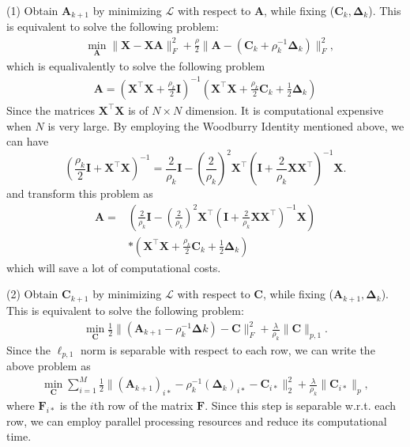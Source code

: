 \documentclass[10pt,twocolumn,letterpaper]{article}
\begin{document}
(1) Obtain $\bm{A}_{k+1}$ by minimizing $\mathcal{L}$ with respect to $\bm{A}$, while fixing ($\bm{C}_{k},\bm{\Delta}_{k}$). This is equivalent to solve the following problem:
\begin{equation}
\begin{split}
\label{e8}
&
\min_{\bm{A}}
\|
\bm{X}
-
\bm{X}\bm{A}
\|_{F}^{2}
+
\frac{\rho}{2}
\|
\bm{A}
-(
\bm{C}_{k}
+
\rho_{k}^{-1}
\bm{\Delta}_{k}
)
\|_{F}^{2},
\end{split}
\end{equation}
which is equalivalently to solve the following problem
\begin{equation}
\begin{split}
\label{e8}
\bm{A}
=
(\bm{X}^{\top}\bm{X}+\frac{\rho_{k}}{2}\bm{I})^{-1}
(\bm{X}^{\top}\bm{X}
+
\frac{\rho_{k}}{2}
\bm{C}_{k}
+
\frac{1}{2}
\bm{\Delta}_{k}
)
\end{split}
\end{equation}
Since the matrices $\bm{X}^{\top}\bm{X}$ is of $N\times N$ dimension. It is computational expensive when $N$ is very large. By employing the Woodburry Identity mentioned above, we can have 
\begin{equation}
(
\frac{\rho_{k}}{2}\bm{I}
+
\bm{X}^{\top}\bm{X}
)^{-1}
=
\frac{2}{\rho_{k}}\bm{I}
-
(\frac{2}{\rho_{k}})^{2}
\bm{X}^{\top}
(
\bm{I}
+
\frac{2}{\rho_{k}}\bm{X}\bm{X}^{\top}
)^{-1}
\bm{X}
.
\end{equation}
and transform this problem as
\begin{equation}
\begin{split}
\label{e8}
\bm{A}
=
&
(
\frac{2}{\rho_{k}}\bm{I}
-
(\frac{2}{\rho_{k}})^{2}
\bm{X}^{\top}
(
\bm{I}
+
\frac{2}{\rho_{k}}\bm{X}\bm{X}^{\top}
)^{-1}
\bm{X}
)
\\
&
*
(\bm{X}^{\top}\bm{X}
+
\frac{\rho_{k}}{2}
\bm{C}_{k}
+
\frac{1}{2}
\bm{\Delta}_{k}
)
\end{split}
\end{equation}
which will save a lot of computational costs.


(2) Obtain $\bm{C}_{k+1}$ by minimizing $\mathcal{L}$ with respect to $\bm{C}$, while fixing ($\bm{A}_{k+1},\bm{\Delta}_{k}$). This is equivalent to solve the following problem:
\begin{equation}
\begin{split}
\label{e6}
\min_{\bm{C}}
\frac{1}{2}
\|
(\bm{A}_{k+1}-\rho_{k}^{-1}\bm{\Delta}{k})
-
\bm{C}
\|_{F}^{2}
+
\frac{\lambda}{\rho_{k}}
\|
\bm{C}
\|_{p,1}.
\end{split}
\end{equation}
Since the $\ell_{p,1}$ norm is separable with respect to each row, we can write the above problem as 
\begin{equation}
\begin{split}
\label{e6}
\min_{\bm{C}}
\sum_{i=1}^{M}
\frac{1}{2}
\|
(\bm{A}_{k+1})_{i*}-\rho_{k}^{-1}(\bm{\Delta}_{k})_{i*}
-
\bm{C}_{i*}
\|_{2}^{2}
+
\frac{\lambda}{\rho_{k}}
\|
\bm{C}_{i*}
\|_{p},
\end{split}
\end{equation}
where $\bm{F}_{i*}$ is the $i$th row of the matrix $\bm{F}$. Since this step is separable w.r.t. each row, we can employ parallel processing resources and reduce its computational time.
\end{document}
